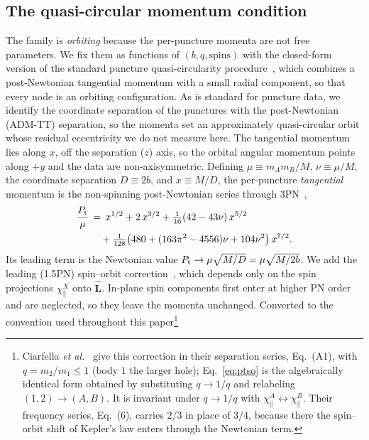 \documentclass[
  aps,
  prd,
  twocolumn,
  10pt,
  amsmath,
  amssymb,
  nofootinbib,
  superscriptaddress,
  floatfix,
]{revtex4-2}
\newcommand{\vect}[1]{\boldsymbol{#1}}
\newif\ifshownew \shownewtrue
\newcommand{\newtext}[1]{\ifshownew{\color{red}#1}\else#1\fi}
\begin{document}
\subsection{The quasi-circular momentum condition}
\label{sec:model:qc}
The family is \emph{orbiting} because the per-puncture momenta are not free parameters.
We fix them as functions of $(b,q,\text{spins})$ with the closed-form version of the standard puncture quasi-circularity procedure~\cite{Husa2008,Walther2009}, which combines a post-Newtonian tangential momentum with a small radial component, so that every node is an orbiting configuration.
As is standard for puncture data, we identify the coordinate separation of the punctures with the post-Newtonian (ADM-TT) separation, so the momenta set an approximately quasi-circular orbit whose residual eccentricity we do not measure here.
The tangential momentum lies along $x$, off
the separation ($z$) axis, so the orbital angular momentum points along $+y$ and
the data are non-axisymmetric.
Defining $\mu \equiv m_Am_B/M$, $\nu \equiv \mu/M$, the coordinate separation $D \equiv 2b$, and
$x\equiv M/D$, the per-puncture \emph{tangential} momentum is the non-spinning
post-Newtonian series through 3PN~\cite{Bruegmann2008,Walther2009},
\begin{equation}
\begin{aligned}
    \frac{P_{\rm t}}{\mu} \, &= \, x^{1/2} + 2\,x^{3/2} + \tfrac{1}{16}(42-43\nu)\,x^{5/2} \\
        &\quad + \tfrac{1}{128}\bigl(480 + (163\pi^2-4556)\nu + 104\nu^2\bigr)\,x^{7/2} .
\end{aligned}
\label{eq:pt}
\end{equation}
Its leading term is the Newtonian value $P_{\rm t}\to\mu\sqrt{M/D}=\mu\sqrt{M/2b}$. We
add the leading (1.5PN) spin--orbit
correction~\cite{Ciarfella2024}, which depends only on the spin projections $\chi^{X}_{\parallel}$
onto $\hat{\vect{L}}$.
In-plane spin components first enter at higher PN order and are neglected, so they leave the momenta unchanged. Converted to the convention used throughout this
paper\footnote{Ciarfella \emph{et al.}~\cite{Ciarfella2024} give this correction \newtext{in their separation series, Eq.~(A1),} with
$q=m_2/m_1\le1$ (body $1$ the larger hole); Eq.~\eqref{eq:ptso} is the
algebraically identical form obtained by substituting $q\to1/q$ and relabeling
$(1,2)\to(A,B)$. It is invariant under $q\to1/q$ with
$\chi^{A}_{\parallel}\leftrightarrow\chi^{B}_{\parallel}$. \newtext{Their frequency series, Eq.~(6), carries $2/3$ in place of $3/4$, because there the spin--orbit shift of Kepler's law enters through the Newtonian term.}}
\end{document}
